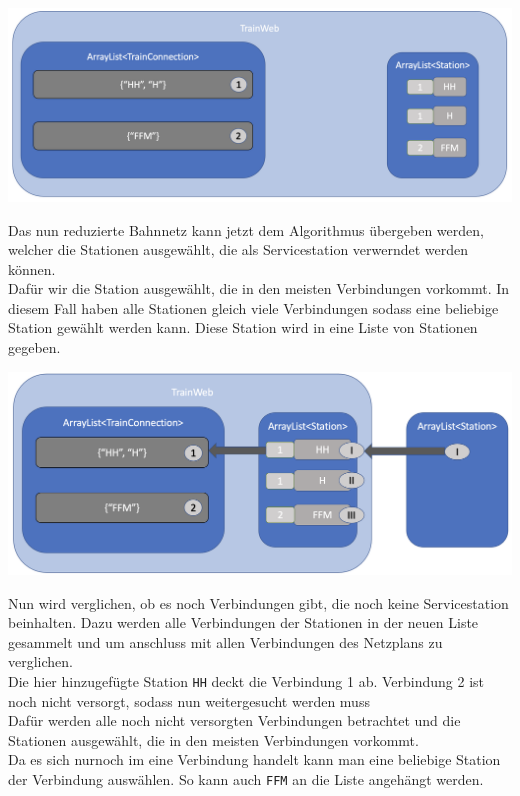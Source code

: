 \begin{center}
    \includegraphics[width=\linewidth]{images/Programmdurchlauf/Datenstruktur03.png}
    \label{test:subsecpar:datenstruktur3}
\end{center}

Das nun reduzierte Bahnnetz kann jetzt dem Algorithmus übergeben werden, welcher die Stationen ausgewählt, die als Servicestation verwerndet werden können.\\
Dafür wir die Station ausgewählt, die in den meisten Verbindungen vorkommt. In diesem Fall haben alle Stationen gleich viele Verbindungen sodass eine beliebige Station gewählt werden kann. Diese Station wird in eine Liste von Stationen gegeben.\\

\begin{center}
    \includegraphics[width=\linewidth]{images/Programmdurchlauf/Datenstruktur04.png}
    \label{test:subsecpar:datenstruktur04}
\end{center}

Nun wird verglichen, ob es noch Verbindungen gibt, die noch keine Servicestation beinhalten. Dazu werden alle Verbindungen der Stationen in der neuen Liste gesammelt und um anschluss mit allen Verbindungen des Netzplans zu verglichen.\\
Die hier hinzugefügte Station \texttt{HH} deckt die Verbindung 1 ab. Verbindung 2 ist noch nicht versorgt, sodass nun weitergesucht werden muss\\
Dafür werden alle noch nicht versorgten Verbindungen betrachtet und die Stationen ausgewählt, die in den meisten Verbindungen vorkommt.\\
Da es sich nurnoch im eine Verbindung handelt kann man eine beliebige Station der Verbindung auswählen. So kann auch \texttt{FFM} an die Liste angehängt werden.\\

